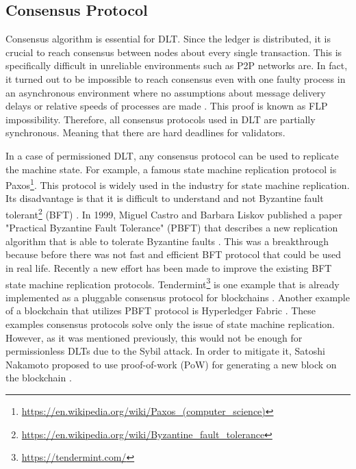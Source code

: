 \subsection{Consensus Protocol}
\label{consensus-algorithm-section}
\quad Consensus algorithm is essential for DLT. Since the ledger is distributed, it is crucial to reach consensus between nodes about every single transaction. This is specifically difficult in unreliable environments such as P2P networks are. In fact, it turned out to be impossible to reach consensus even with one faulty process in an asynchronous environment where no assumptions about message delivery delays or relative speeds of processes are made \cite{fischer_impossibility_1985}. This proof is known as FLP impossibility. Therefore, all consensus protocols used in DLT are partially synchronous. Meaning that there are hard deadlines for validators.

In a case of permissioned DLT, any consensus protocol can be used to replicate the machine state. For example, a famous state machine replication protocol is Paxos\footnote{\url{https://en.wikipedia.org/wiki/Paxos_(computer_science)}}. This protocol is widely used in the industry for state machine replication. Its disadvantage is that it is difficult to understand and not Byzantine fault tolerant\footnote{\url{https://en.wikipedia.org/wiki/Byzantine_fault_tolerance}} (BFT) \cite{buchman_tendermint:_2016}. %
In 1999, Miguel Castro and Barbara Liskov published a paper "Practical Byzantine Fault Tolerance" (PBFT) that describes a new replication algorithm that is able to tolerate Byzantine faults \cite{castro_practical_1999}. This was a breakthrough because before there was not fast and efficient BFT protocol that could be used in real life. Recently a new effort has been made to improve the existing BFT state machine replication protocols. Tendermint\footnote{\url{https://tendermint.com/}} is one example that is already implemented as a pluggable consensus protocol for blockchains \cite{buchman_tendermint:_2016}. Another example of a blockchain that utilizes PBFT protocol is Hyperledger Fabric \cite{cachin_architecture_2016}. These examples consensus protocols solve only the issue of state machine replication. However, as it was mentioned previously, this would not be enough for permissionless DLTs due to the Sybil attack. In order to mitigate it, Satoshi Nakamoto proposed to use proof-of-work (PoW) for generating a new block on the blockchain \cite{nakamoto_bitcoin:_2008}.


